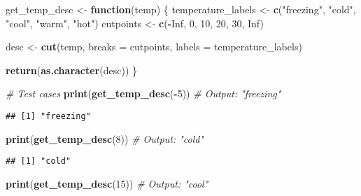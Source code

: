 \documentclass[
]{article}
\newenvironment{Shaded}{\begin{snugshade}}{\end{snugshade}}
\newcommand{\AttributeTok}[1]{\textcolor[rgb]{0.13,0.29,0.53}{#1}}
\newcommand{\CommentTok}[1]{\textcolor[rgb]{0.56,0.35,0.01}{\textit{#1}}}
\newcommand{\ConstantTok}[1]{\textcolor[rgb]{0.56,0.35,0.01}{#1}}
\newcommand{\ControlFlowTok}[1]{\textcolor[rgb]{0.13,0.29,0.53}{\textbf{#1}}}
\newcommand{\DecValTok}[1]{\textcolor[rgb]{0.00,0.00,0.81}{#1}}
\newcommand{\FunctionTok}[1]{\textcolor[rgb]{0.13,0.29,0.53}{\textbf{#1}}}
\newcommand{\NormalTok}[1]{#1}
\newcommand{\OtherTok}[1]{\textcolor[rgb]{0.56,0.35,0.01}{#1}}
\newcommand{\SpecialCharTok}[1]{\textcolor[rgb]{0.81,0.36,0.00}{\textbf{#1}}}
\newcommand{\StringTok}[1]{\textcolor[rgb]{0.31,0.60,0.02}{#1}}
\begin{document}
\begin{Shaded}
\begin{Highlighting}[]
\NormalTok{get\_temp\_desc }\OtherTok{\textless{}{-}} \ControlFlowTok{function}\NormalTok{(temp) \{}
\NormalTok{  temperature\_labels }\OtherTok{\textless{}{-}} \FunctionTok{c}\NormalTok{(}\StringTok{"freezing"}\NormalTok{, }\StringTok{"cold"}\NormalTok{, }\StringTok{"cool"}\NormalTok{, }\StringTok{"warm"}\NormalTok{, }\StringTok{"hot"}\NormalTok{)}
\NormalTok{  cutpoints }\OtherTok{\textless{}{-}} \FunctionTok{c}\NormalTok{(}\SpecialCharTok{{-}}\ConstantTok{Inf}\NormalTok{, }\DecValTok{0}\NormalTok{, }\DecValTok{10}\NormalTok{, }\DecValTok{20}\NormalTok{, }\DecValTok{30}\NormalTok{, }\ConstantTok{Inf}\NormalTok{)}
  
\NormalTok{  desc }\OtherTok{\textless{}{-}} \FunctionTok{cut}\NormalTok{(temp, }\AttributeTok{breaks =}\NormalTok{ cutpoints, }\AttributeTok{labels =}\NormalTok{ temperature\_labels)}
  
  \FunctionTok{return}\NormalTok{(}\FunctionTok{as.character}\NormalTok{(desc))}
\NormalTok{\}}

\CommentTok{\# Test cases}
\FunctionTok{print}\NormalTok{(}\FunctionTok{get\_temp\_desc}\NormalTok{(}\SpecialCharTok{{-}}\DecValTok{5}\NormalTok{))   }\CommentTok{\# Output: "freezing"}
\end{Highlighting}
\end{Shaded}

\begin{verbatim}
## [1] "freezing"
\end{verbatim}

\begin{Shaded}
\begin{Highlighting}[]
\FunctionTok{print}\NormalTok{(}\FunctionTok{get\_temp\_desc}\NormalTok{(}\DecValTok{8}\NormalTok{))    }\CommentTok{\# Output: "cold"}
\end{Highlighting}
\end{Shaded}

\begin{verbatim}
## [1] "cold"
\end{verbatim}

\begin{Shaded}
\begin{Highlighting}[]
\FunctionTok{print}\NormalTok{(}\FunctionTok{get\_temp\_desc}\NormalTok{(}\DecValTok{15}\NormalTok{))   }\CommentTok{\# Output: "cool"}
\end{Highlighting}
\end{Shaded}
\end{document}
